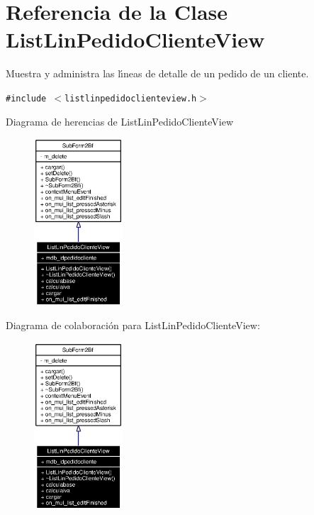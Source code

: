 \section{Referencia de la Clase List\-Lin\-Pedido\-Cliente\-View}
\label{classListLinPedidoClienteView}
Muestra y administra las l\'{\i}neas de detalle de un pedido de un cliente.  


{\tt \#include $<$listlinpedidoclienteview.h$>$}

Diagrama de herencias de List\-Lin\-Pedido\-Cliente\-View\begin{figure}[H]
\begin{center}
\leavevmode
\includegraphics[width=94pt]{classListLinPedidoClienteView__inherit__graph}
\end{center}
\end{figure}
Diagrama de colaboraci\'{o}n para List\-Lin\-Pedido\-Cliente\-View:\begin{figure}[H]
\begin{center}
\leavevmode
\includegraphics[width=94pt]{classListLinPedidoClienteView__coll__graph}
\end{center}
\end{figure}
